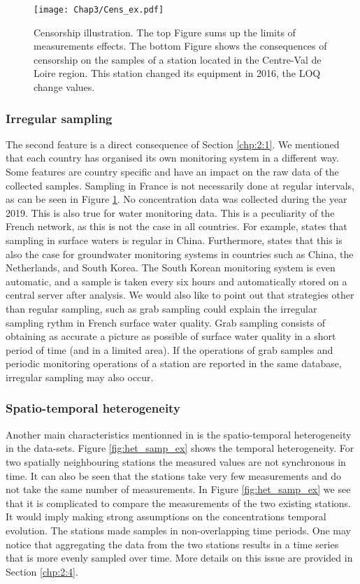 \begin{figure}
    \centering
    \texttt{[image: Chap3/Cens\_ex.pdf]}
    \caption{Censorship illustration. The top Figure sums up the limits of measurements effects. The bottom Figure shows the consequences of censorship on the samples of a station located in the Centre-Val de Loire region. This station changed its equipment in 2016, the LOQ change values.}
    \label{fig:cens_ex}
\end{figure}

\subsubsection{Irregular sampling}

The second feature is a direct consequence of Section \ref{chp:2:1}. We mentioned that each country has organised its own monitoring system in a different way. Some features are country specific and have an impact on the raw data of the collected samples. Sampling in France is not necessarily done at regular intervals, as can be seen in Figure \ref{fig:cens_ex}. No concentration data was collected during the year 2019. This is also true for water monitoring data. This is a peculiarity of the French network, as this is not the case in all countries. For example, \cite{Zhang2008} states that sampling in surface waters is regular in China. Furthermore, \cite{Joergensen2008} states that this is also the case for groundwater monitoring systems in countries such as China, the Netherlands, and South Korea. The South Korean monitoring system is even automatic, and a sample is taken every six hours and automatically stored on a central server after analysis. We would also like to point out that strategies other than regular sampling, such as grab sampling \cite{Novic2017} could explain the irregular sampling rythm in French surface water quality. Grab sampling consists of obtaining as accurate a picture as possible of surface water quality in a short period of time (and in a limited area). If the operations of grab samples and periodic monitoring operations of a station are reported in the same database, irregular sampling may also occur.  

\subsubsection{Spatio-temporal heterogeneity}

Another main characteristics mentionned in \cite{Baran2022} is the spatio-temporal heterogeneity in the data-sets. Figure \ref{fig:het_samp_ex} shows the temporal heterogeneity. For two spatially neighbouring stations the measured values are not synchronous in time. It can also be seen that the stations take very few measurements and do not take the same number of measurements. In Figure \ref{fig:het_samp_ex} we see that it is complicated to compare the measurements of the two existing stations. It would imply making strong assumptions on the concentrations temporal evolution. The stations made samples in non-overlapping time periods. One may notice that aggregating the data from the two stations results in a time series that is more evenly sampled over time. More details on this issue are provided in Section \ref{chp:2:4}. 

